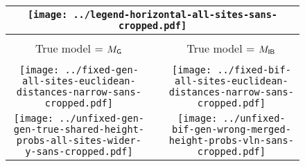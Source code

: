 \documentclass[border=10pt,varwidth=30cm]{standalone}
\newcommand{\genmodel}{\ensuremath{M_{\textrm{\sffamily G}}}\xspace}
\newcommand{\bimodel}{\ensuremath{M_{\textrm{\sffamily IB}}}\xspace}
\begin{document}
\begin{figure}
    \setlength\arrayrulewidth{2pt}
    \centering
    \begin{tabular}{@{}ccc@{}}
        \hline
        \multicolumn{3}{|c|}{\texttt{[image: ../legend-horizontal-all-sites-sans-cropped.pdf]}} \\
        \hline
        & & \\
        {\Huge True model = \genmodel}
        &
        &
        {\Huge True model = \bimodel}
        \\[2ex]
        \cline{1-1}\cline{3-3}
        & & \\
        \texttt{[image: ../fixed-gen-all-sites-euclidean-distances-narrow-sans-cropped.pdf]}
        &
        &
        \texttt{[image: ../fixed-bif-all-sites-euclidean-distances-narrow-sans-cropped.pdf]}
        \\
        \texttt{[image: ../unfixed-gen-gen-true-shared-height-probs-all-sites-wider-y-sans-cropped.pdf]}
        &
        &
        \texttt{[image: ../unfixed-bif-gen-wrong-merged-height-probs-vln-sans-cropped.pdf]}
        \\
    \end{tabular}
\end{figure}
\end{document}
